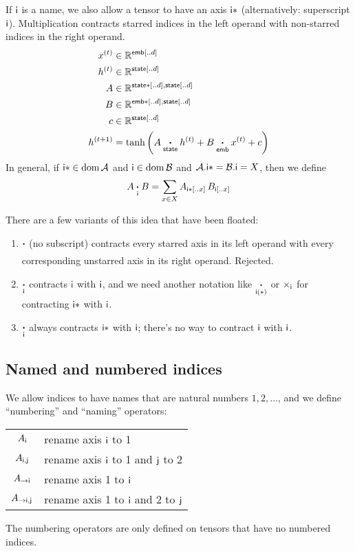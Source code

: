 \documentclass{article}
\DeclareMathOperator{\tupledom}{dom}
\newcommand{\tupleproj}[2]{#1.\name{#2}}
\begin{document}
If $\mathsf{i}$ is a name, we also allow a tensor to have an axis $\mathsf{i*}$ (alternatively: superscript $\mathsf{i}$). Multiplication contracts starred indices in the left operand with non-starred indices in the right operand.
\begin{align*}
x^{(t)} &\in \mathbb{R}^{\mathsf{emb}[..d]} \\
h^{(t)} &\in \mathbb{R}^{\mathsf{state}[..d]} \\
A &\in \mathbb{R}^{\mathsf{state*}[..d], \mathsf{state}[..d]} \\
B &\in \mathbb{R}^{\mathsf{emb*}[..d], \mathsf{state}[..d]} \\
c &\in \mathbb{R}^{\mathsf{state}[..d]} \\
h^{(t+1)} &= \tanh\left( A \mathbin{\mathop{\boldsymbol\cdot}\limits_{\mathsf{state}}} h^{(t)} + B \mathbin{\mathop{\boldsymbol\cdot}\limits_{\mathsf{emb}}} x^{(t)} + c \right) 
\end{align*}
In general, if $\name{i*} \in \tupledom \mathcal{A}$ and $\name{i} \in \tupledom \mathcal{B}$ and $\tupleproj{\mathcal{A}}{i*} = \tupleproj{\mathcal{B}}{i} = X$, then we define
\begin{equation*}
A \mathbin{\mathop{\boldsymbol\cdot}\limits_{\mathsf{i}}} B = \sum_{x \in X} A_{\mathsf{i*}[..x]} \, B_{\mathsf{i}[..x]}
\end{equation*}

There are a few variants of this idea that have been floated:
\begin{enumerate}
\item $\mathbin{\mathop{\boldsymbol\cdot}\limits_{\mathsf{}}}$ (no subscript) contracts every starred axis in its left operand with every corresponding unstarred axis in its right operand. Rejected.
\item $\mathbin{\mathop{\boldsymbol\cdot}\limits_{\mathsf{i}}}$ contracts $\mathsf{i}$ with $\mathsf{i}$, and we need another notation like $\mathbin{\mathop{\boldsymbol\cdot}\limits_{\mathsf{i(*)}}}$ or $\mathop\times\displaylimits_{\mathsf{i}}$ for contracting $\mathsf{i*}$ with $\mathsf{i}$.
\item $\mathbin{\mathop{\boldsymbol\cdot}\limits_{\mathsf{i}}}$ always contracts $\mathsf{i*}$ with $\mathsf{i}$; there's no way to contract $\mathsf{i}$ with $\mathsf{i}$.
\end{enumerate}

\subsection{Named and numbered indices}
\label{sec:tensorsoftensors}

We allow indices to have names that are natural numbers $1, 2, \ldots$, and we define ``numbering'' and ``naming'' operators:
\begin{center}
\begin{tabular}{cl}
$A_{\mathsf{i}}$ & rename axis $\mathsf{i}$ to 1 \\
$A_{\mathsf{i},\mathsf{j}}$ & rename axis $\mathsf{i}$ to 1 and $\mathsf{j}$ to 2 \\
$A_{\rightarrow\mathsf{i}}$ & rename axis 1 to $\mathsf{i}$ \\
$A_{\rightarrow\mathsf{i},\mathsf{j}}$ & rename axis 1 to $\mathsf{i}$ and 2 to $\mathsf{j}$
\end{tabular}
\end{center}
The numbering operators are only defined on tensors that have no numbered indices.
\end{document}
